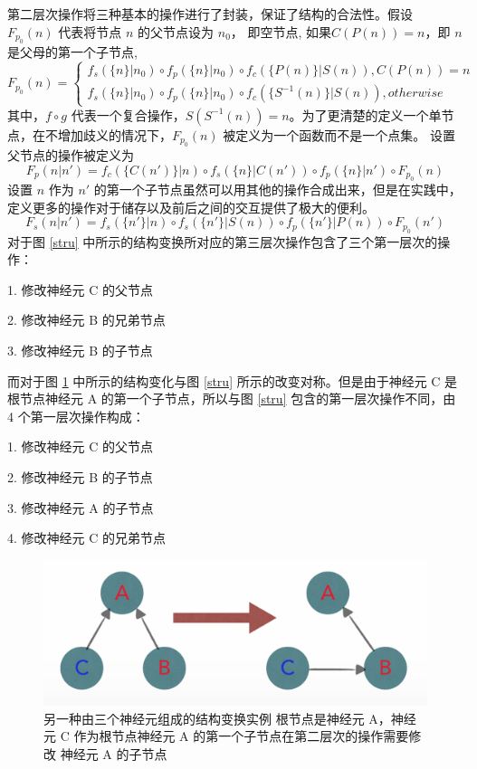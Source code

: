 第二层次操作将三种基本的操作进行了封装，保证了结构的合法性。假设 $F_{p_0}(n)$ 代表将节点 $n$ 的父节点设为 $n_0$， 即空节点, 如果$C(P(n)) = n$，即 $n$ 是父母的第一个子节点,
$$
F_{p_0}(n) =
\left\{
\begin{aligned}
f_s(\{n\} | n_0) \circ f_p(\{n\} | n_0) \circ f_c(\{P(n)\} | S(n)), C(P(n)) = n\\
f_s(\{n\} | n_0) \circ f_p(\{n\} | n_0) \circ f_c(\{S^{-1}(n)\} | S(n)), otherwise
\end{aligned}
\right.
$$
其中，$f \circ g$ 代表一个复合操作，$S(S^{-1}(n)) = n$。为了更清楚的定义一个单节点，在不增加歧义的情况下，$F_{p_0}(n)$ 被定义为一个函数而不是一个点集。
设置父节点的操作被定义为
$$F_p(n|n') = f_c(\{C(n')\}|n) \circ f_s(\{n\}|C(n'))  \circ f_p(\{n\}|n') \circ F_{p_0}(n)$$
设置 $n$ 作为 $n{}'$ 的第一个子节点虽然可以用其他的操作合成出来，但是在实践中，定义更多的操作对于储存以及前后之间的交互提供了极大的便利。
$$F_s(n|n') = f_s(\{n'\}|n) \circ f_s(\{n'\}|S(n))  \circ f_p(\{n'\}|P(n)) \circ F_{p_0}(n')$$
对于图 \ref{stru} 中所示的结构变换所对应的第三层次操作包含了三个第一层次的操作：

1. 修改神经元 C 的父节点

2. 修改神经元 B 的兄弟节点

3. 修改神经元 B 的子节点

而对于图 \ref{stru2} 中所示的结构变化与图 \ref{stru} 所示的改变对称。但是由于神经元 C 是根节点神经元 A 的第一个子节点，所以与图 \ref{stru} 包含的第一层次操作不同，由 4 个第一层次操作构成：

1. 修改神经元 C 的父节点

2. 修改神经元 B 的子节点

3. 修改神经元 A 的子节点

4. 修改神经元 C 的兄弟节点

\begin{figure}
\centering
\includegraphics[width=148mm]{images/stru2}
\caption{另一种由三个神经元组成的结构变换实例 根节点是神经元 A，神经元 C 作为根节点神经元 A 的第一个子节点在第二层次的操作需要修改 神经元 A 的子节点}
\label{stru2}
\end{figure}

